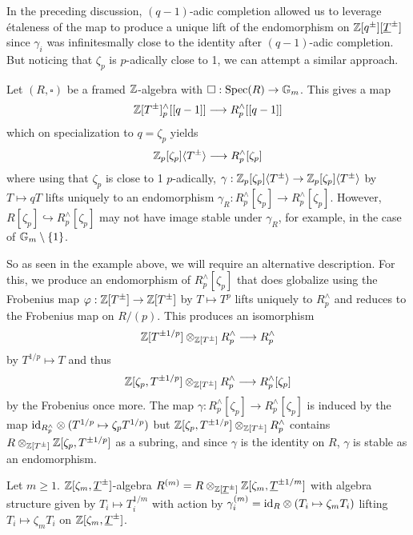 In the preceding discussion, $(q-1)$-adic completion allowed us to leverage \'{e}taleness of the map to produce a unique lift of the endomorphism on $\mathbb{Z}[q^{\pm}][\underline{T}^{\pm}]$ since $\gamma_{i}$ was infinitesmally close to the identity after $(q-1)$-adic completion. But noticing that $\zeta_{p}$ is $p$-adically close to 1, we can attempt a similar approach. 
\begin{example}
    Let $(R,\square)$ be a framed $\mathbb{Z}$-algebra with $\square:\operatorname{Spec}(R)\to\mathbb{G}_{m}$. This gives a map 
    $$\mathbb{Z}[T^{\pm}]_{p}^{\wedge}[[q-1]]\longrightarrow R_{p}^{\wedge}[[q-1]]$$
    which on specialization to $q=\zeta_{p}$ yields 
    $$\mathbb{Z}_{p}[\zeta_{p}]\langle T^{\pm}\rangle\longrightarrow R_{p}^{\wedge}[\zeta_{p}]$$
    where using that $\zeta_{p}$ is close to 1 $p$-adically, $\gamma:\mathbb{Z}_{p}[\zeta_{p}]\langle T^{\pm}\rangle\to\mathbb{Z}_{p}[\zeta_{p}]\langle T^{\pm}\rangle$ by $T\mapsto qT$ lifts uniquely to an endomorphism $\gamma_{R}:R_{p}^{\wedge}[\zeta_{p}]\to R_{p}^{\wedge}[\zeta_{p}]$. However, $R[\zeta_{p}]\hookrightarrow R^{\wedge}_{p}[\zeta_{p}]$ may not have image stable under $\gamma_{R}$, for example, in the case of $\mathbb{G}_{m}\setminus\{1\}$.  
\end{example}
So as seen in the example above, we will require an alternative description. For this, we produce an endomorphism of $R_{p}^{\wedge}[\zeta_{p}]$ that does globalize using the Frobenius map $\varphi:\mathbb{Z}[T^{\pm}]\to\mathbb{Z}[T^{\pm}]$ by $T\mapsto T^{p}$ lifts uniquely to $R^{\wedge}_{p}$ and reduces to the Frobenius map on $R/(p)$. This produces an isomorphism
$$\mathbb{Z}[T^{\pm 1/p}]\otimes_{\mathbb{Z}[T^{\pm}]}R_{p}^{\wedge}\longrightarrow R_{p}^{\wedge}$$ by $T^{1/p}\mapsto T$ and thus 
$$\mathbb{Z}[\zeta_{p},T^{\pm 1/p}]\otimes_{\mathbb{Z}[T^{\pm}]}R^{\wedge}_{p}\longrightarrow R_{p}^{\wedge}[\zeta_{p}]$$
by the Frobenius once more. The map $\gamma:R_{p}^{\wedge}[\zeta_{p}]\to R_{p}^{\wedge}[\zeta_{p}]$ is induced by the map $\mathrm{id}_{R^{\wedge}_{p}}\otimes(T^{1/p}\mapsto \zeta_{p}T^{1/p})$ but $\mathbb{Z}[\zeta_{p},T^{\pm 1/p}]\otimes_{\mathbb{Z}[T^{\pm}]}R^{\wedge}_{p}$ contains $R\otimes_{\mathbb{Z}[T^{\pm}]}\mathbb{Z}[\zeta_{p},T^{\pm 1/p}]$ as a subring, and since $\gamma$ is the identity on $R$, $\gamma$ is stable as an endomorphism. 
\begin{definition}
    Let $m\geq 1$. $\mathbb{Z}[\zeta_{m},\underline{T}^{\pm}]$-algebra $R^{(m)}=R\otimes_{\mathbb{Z}[\underline{T}^{\pm}]}\mathbb{Z}[\zeta_{m},\underline{T}^{\pm 1/m}]$ with algebra structure given by $T_{i}\mapsto T_{i}^{1/m}$ with action by $\gamma^{(m)}_{i}=\mathrm{id}_{R}\otimes(T_{i}\mapsto \zeta_{m}T_{i})$ lifting $T_{i}\mapsto\zeta_{m}T_{i}$ on $\mathbb{Z}[\zeta_{m},\underline{T}^{\pm}]$. 
\end{definition}
